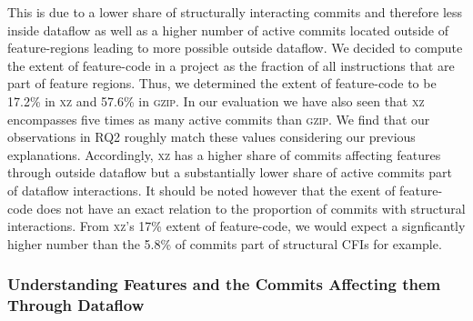 This is due to a lower share of structurally interacting commits and therefore less inside dataflow as well as a higher number of active commits located outside of feature-regions leading to more possible outside dataflow.
We decided to compute the extent of feature-code in a project as the fraction of all instructions that are part of feature regions.
Thus, we determined the extent of feature-code to be 17.2\% in \textsc{xz} and 57.6\% in \textsc{gzip}. 
In our evaluation we have also seen that \textsc{xz} encompasses five times as many active commits than \textsc{gzip}.
We find that our observations in RQ2 roughly match these values considering our previous explanations.
Accordingly, \textsc{xz} has a higher share of commits affecting features through outside dataflow but a substantially lower share of active commits part of dataflow interactions.
It should be noted however that the exent of feature-code does not have an exact relation to the proportion of commits with structural interactions.
From \textsc{xz}'s 17\% extent of feature-code, we would expect a signficantly higher number than the 5.8\% of commits part of structural CFIs for example.

\subsubsection*{Understanding Features and the Commits Affecting them Through Dataflow}

